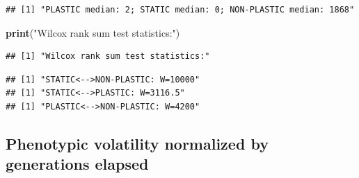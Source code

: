 \documentclass[]{book}
\newenvironment{Shaded}{\begin{snugshade}}{\end{snugshade}}
\newcommand{\ControlFlowTok}[1]{\textcolor[rgb]{0.13,0.29,0.53}{\textbf{#1}}}
\newcommand{\DataTypeTok}[1]{\textcolor[rgb]{0.13,0.29,0.53}{#1}}
\newcommand{\DecValTok}[1]{\textcolor[rgb]{0.00,0.00,0.81}{#1}}
\newcommand{\KeywordTok}[1]{\textcolor[rgb]{0.13,0.29,0.53}{\textbf{#1}}}
\newcommand{\NormalTok}[1]{#1}
\newcommand{\OperatorTok}[1]{\textcolor[rgb]{0.81,0.36,0.00}{\textbf{#1}}}
\newcommand{\OtherTok}[1]{\textcolor[rgb]{0.56,0.35,0.01}{#1}}
\newcommand{\StringTok}[1]{\textcolor[rgb]{0.31,0.60,0.02}{#1}}
\begin{document}
\begin{verbatim}
## [1] "PLASTIC median: 2; STATIC median: 0; NON-PLASTIC median: 1868"
\end{verbatim}

\begin{Shaded}
\begin{Highlighting}[]
\KeywordTok{print}\NormalTok{(}\StringTok{"Wilcox rank sum test statistics:"}\NormalTok{)}
\end{Highlighting}
\end{Shaded}

\begin{verbatim}
## [1] "Wilcox rank sum test statistics:"
\end{verbatim}

\begin{Shaded}
\end{Shaded}

\begin{verbatim}
## [1] "STATIC<-->NON-PLASTIC: W=10000"
## [1] "STATIC<-->PLASTIC: W=3116.5"
## [1] "PLASTIC<-->NON-PLASTIC: W=4200"
\end{verbatim}

\hypertarget{phenotypic-volatility-normalized-by-generations-elapsed}{%
\subsection{Phenotypic volatility normalized by generations elapsed}\label{phenotypic-volatility-normalized-by-generations-elapsed}}
\end{document}

